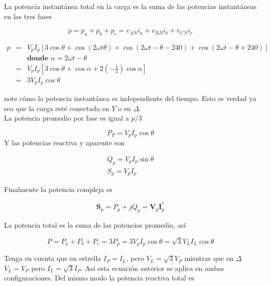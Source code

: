 La potencia instantánea total en la carga es la suma de las potencias instantáneas en las tres fases

\begin{equation*}
p = p_a + p_b + p_c = v_{AN}i_a + v_{BN} i_b + v_{CN} i_c
\end{equation*}

\begin{eqnarray*}
p &=& V_p I_p \left[ 3 \cos \theta + \cos (2 \omega t \theta) + \cos (2 \omega t - \theta - 240) + \cos(2 \omega t - \theta + 240) \right] \\
  & & \textbf{donde } \alpha = 2 \omega t - \theta \\
&=& V_pI_p \left[ 3 \cos \theta + \cos \alpha +2 \left( -\frac{1}{2} \right) \cos \alpha \right] \\
&=& 3V_pI_p \cos \theta
\end{eqnarray*}

note cómo la potencia instantánea es independiente del tiempo. Esto es verdad ya sea que la carga esté conectada en $Y$ o en $\Delta$. \\

La potencia promedio por fase es igual a $p/3$

\begin{equation*}
P_P = V_p I_p \cos \theta
\end{equation*}
 Y las potencias reactiva y aparente son 

\begin{eqnarray*}
Q_p = V_p I_p \sin \theta \\
S_p = V_p I_p
\end{eqnarray*}

  Finalmente la potencia compleja es

\begin{equation*}
\mathbf{S}_p = P_p + j Q_p = \mathbf{V}_p \mathbf{I}_p^{*}
\end{equation*}

La potencia total es la suma de las potencias promedio, así

\begin{equation*}
P = P_a + P_b + P_c = 3 P_p = 3 V_p I_p \cos \theta = \sqrt{3}V_L I_L \cos \theta
\end{equation*}

Tenga en cuenta que en estrella $I_P = I_L$, pero $V_L = \sqrt{3}V_P$ mientras que en $\Delta$ $V_L = V_P$ pero $I_L = \sqrt{3}I_P$. Así esta ecuación anterior se aplica en ambas configuraciones. Del mismo modo la potencia reactiva total es 

